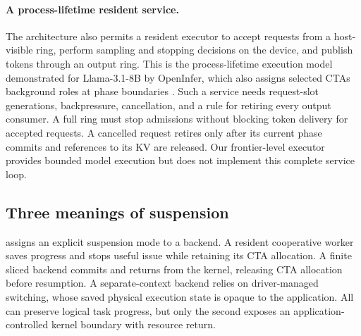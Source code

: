 \paragraph{A process-lifetime resident service.}
The architecture also permits a resident executor to accept requests from
a host-visible ring, perform sampling and stopping decisions on the device,
and publish tokens through an output ring. This is the process-lifetime
execution model demonstrated for Llama-3.1-8B by OpenInfer, which also
assigns selected CTAs background roles at phase boundaries
\cite{Nourai2026GPUOS}. Such a service needs request-slot generations,
backpressure, cancellation, and a rule for retiring every output consumer.
A full ring must stop admissions without blocking token delivery for accepted
requests. A cancelled request retires only after its current phase commits
and references to its KV are released. Our frontier-level executor provides
bounded model execution but does not implement this complete service loop.

\subsection{Three meanings of suspension}
\system{} assigns an explicit suspension mode to a backend. A resident
cooperative worker saves progress and stops useful issue while retaining its
CTA allocation. A finite sliced backend commits and returns from the kernel,
releasing CTA allocation before resumption. A separate-context backend relies
on driver-managed switching, whose saved physical execution state is opaque
to the application. All can preserve logical task progress, but only the
second exposes an application-controlled kernel boundary with resource return.